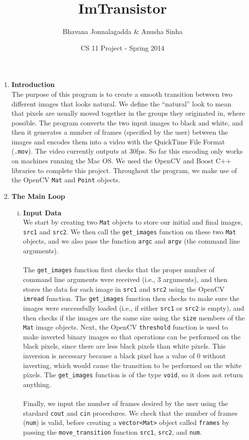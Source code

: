 \documentclass[12pt]{article}
\newcommand{\code}[1]{\texttt{#1}}
\begin{document}
\title{ImTransistor}
\author{Bhavana Jonnalagadda \& Anusha Sinha}
\date{CS 11 Project - Spring 2014}
\maketitle

\begin{enumerate}

\item \textbf{Introduction} \\
The purpose of this program is to create a smooth transition between two different images that looks natural. We define the ``natural'' look to mean that pixels are usually moved together in the groups they originated in, where possible. The program converts the two input images to black and white, and then it generates a number of frames (specified by the user) between the images and encodes them into a video with the QuickTime File Format (\code{.mov}). The video currently outputs at 30fps. So far this encoding only works on machines running the Mac OS. We used the OpenCV and Boost C++ libraries to complete this project. Throughout the program, we make use of the OpenCV \code{Mat} and \code{Point} objects.

\item \textbf{The Main Loop}
\begin{enumerate}[i.]
\item \textbf{Input Data} \\
We start by creating two \code{Mat} objects to store our initial and final images, \code{src1} and \code{src2}. We then call the \code{get\_images} function on these two \code{Mat} objects, and we also pass the function \code{argc} and \code{argv} (the command line arguments). \\
\\
The \code{get\_images} function first checks that the proper number of command line arguments were received (i.e., 3 arguments), and then stores the data for each image in \code{src1} and \code{src2} using the OpenCV \code{imread} function. The \code{get\_images} function then checks to make sure the images were successfully loaded (i.e., if either \code{src1} or \code{src2} is empty), and then checks if the images are the same size using the \code{size} members of the \code{Mat} image objects. Next, the OpenCV \code{threshold} function is used to make inverted binary images so that operations can be performed on the black pixels, since there are less black pixels than white pixels. This inversion is necessary because a black pixel has a value of 0 without  inverting, which would cause the transition to be performed on the white pixels. The \code{get\_images} function is of the type \code{void}, so it does not return anything. \\
\\
Finally, we input the number of frames desired by the user using the stardard \code{cout} and \code{cin} procedures. We check that the number of frames (\code{num}) is valid, before creating a \code{vector<Mat>} object called \code{frames} by passing the \code{move\_transition} function \code{src1}, \code{src2}, and \code{num}.


\end{enumerate}
\end{enumerate}
\end{document}
